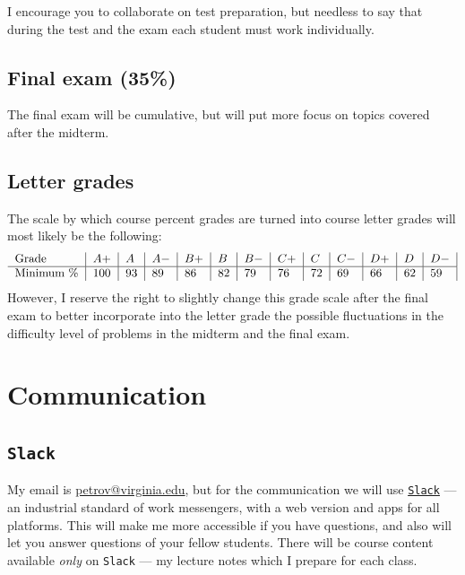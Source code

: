 \documentclass[oneside,11pt]{amsart}
\begin{document}
I encourage you to collaborate on test preparation, but needless to say that
during the test and the exam each student must work individually.

\subsection{Final exam (35\%)}

The final exam will be cumulative, but will put more focus on topics covered after the midterm.

\subsection*{Letter grades}

The scale by which course percent grades are turned into course letter grades
will most likely be the following:
\begin{equation*}
	\begin{tabular}{l|l|l|l|l|l|l|l|l|l|l|l|l|}
		Grade      & $ A+	$ & $A	$ & $A-	$ & $B+	$ & $B	$ & $B-	$ & $C+	$ & $C	$ & $C-	$ & $D+	$ & $D	$ & $D-$ \\
		\hline
		Minimum \% & 100     & 93   & 89    & 86    & 82    & 79    & 76    & 72    & 69    & 66    & 62    & 59
	\end{tabular}
\end{equation*}
However, I reserve the right to slightly change this grade scale after the
final exam to better incorporate into the letter grade 
the possible fluctuations in the difficulty level of problems 
in the midterm and the final exam.

\section{Communication}
\label{comm}

\subsection{\texttt{Slack}}

My email is \href{mailto:petrov@virginia.edu}{petrov@virginia.edu}, but for the
communication we will use \href{https://slack.com}{\texttt{Slack}} --- an
industrial standard of work messengers, with a web version and apps for all
platforms. This will make me more accessible if you have questions, and also
will let you answer questions of your fellow students. There will be course
content available \emph{only} on \texttt{Slack} --- my
lecture notes which I prepare for each class.
\end{document}
